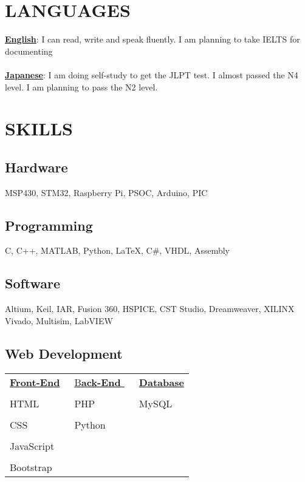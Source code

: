 \documentclass[10pt]{article}
\begin{document}
\section{LANGUAGES}
\underline{\bfseries{English}}:   I can read, write and speak fluently. I am planning to take IELTS for documenting \\ \\
\underline{\bfseries{Japanese}}:    I am doing self-study to get the JLPT test. I almost passed the N4 level. I am planning to pass the N2 level.
\newpage
\vspace{2em}
\section{SKILLS}
\vspace{1em}
\subsection{Hardware}
\vspace{1em}
MSP430, STM32, Raspberry Pi, PSOC, Arduino, PIC
\vspace{1em}
\subsection{Programming}
\vspace{1em}
C, C++, MATLAB, Python,  {\LaTeX}, C\#,  VHDL, Assembly
\vspace{1em}
\subsection{Software}
\vspace{1em}
Altium, Keil, IAR, Fusion 360, HSPICE, CST Studio, Dreamweaver, XILINX Vivado, Multisim, LabVIEW
\vspace{1em}
\subsection{Web Development}

\begin{table}[h!]


\begin{center}
\begin{tabular}{p{10em} p{10em} p{10em} } 

 \underline{\bfseries{Front-End}}~ & \underline{B\bfseries{ack-End }}  ~ & \underline{\bfseries{Database }}  \\              
 & & \\
 HTML & PHP & MySQL  \\ 
 & & \\
 CSS& Python & \\ 
 & & \\
 JavaScript & & \\ 
 & & \\
 Bootstrap \\
  


\end{tabular}
\end{center}
\end{table}
\end{document}
